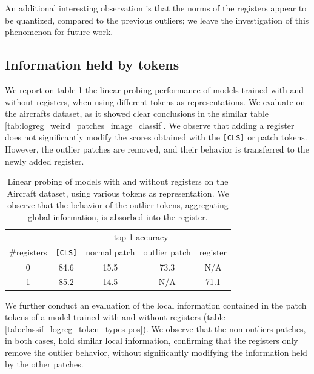 \documentclass{article} \usepackage{iclr2024_conference,times}
\begin{document}
An additional interesting observation is that the norms of the registers appear to be quantized, compared to the previous outliers; we leave the investigation of this phenomenon for future work.

\subsection{Information held by tokens}
We report on table \ref{tab:classif_logreg_token_types-acc} the linear probing performance of models trained with and without registers, when using different tokens as representations. We evaluate on the aircrafts dataset, as it showed clear conclusions in the similar table \ref{tab:logreg_weird_patches_image_classif}. We observe that adding a register does not significantly modify the scores obtained with the \texttt{[CLS]} or patch tokens. However, the outlier patches are removed, and their behavior is transferred to the newly added register.

\begin{table}[h]
    \centering
    \begin{tabular}{ccccc}
         \toprule
            & \multicolumn{4}{c}{top-1 accuracy} \\
         \#registers & \texttt{[CLS]} & normal patch & outlier patch & register \\
         \midrule
         0 & 84.6 & 15.5 & 73.3 & N/A \\
         1 & 85.2 & 14.5 & N/A & 71.1 \\
         \bottomrule
    \end{tabular}
    \caption{Linear probing of models with and without registers on the Aircraft dataset, using various tokens as representation. We observe that the behavior of the outlier tokens, aggregating global information, is absorbed into the register.}
    \label{tab:classif_logreg_token_types-acc}
\end{table}

We further conduct an evaluation of the local information contained in the patch tokens of a model trained with and without registers (table \ref{tab:classif_logreg_token_types-pos}). We observe that the non-outliers patches, in both cases, hold similar local information, confirming that the registers only remove the outlier behavior, without significantly modifying the information held by the other patches.
\end{document}
